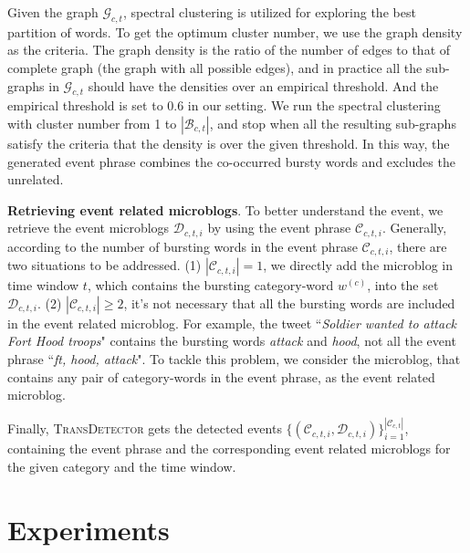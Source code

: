 \documentclass{article}
\begin{document}
Given the graph \(\mathcal{G}_{c,t}\), spectral clustering\cite{von2007tutorial} is utilized for exploring the best partition of words. 
To get the optimum cluster number, we use the graph density as the criteria.
The graph density is the ratio of the number of edges to that of complete graph (the graph with all possible edges), and in practice all the sub-graphs in \(\mathcal{G}_{c,t}\) should have the densities over an empirical threshold. 
And the empirical threshold is set to 0.6 in our setting.
We run the spectral clustering with cluster number from 1 to \(|\mathcal{B}_{c,t}|\), and stop when all the resulting sub-graphs satisfy the criteria that the density is over the given threshold. 
In this way, the generated event phrase combines the co-occurred bursty words and excludes the unrelated. 


\textbf{Retrieving event related microblogs}. 
To better understand the event, we retrieve the event microblogs \(\mathcal{D}_{c,t,i}\) by using the event phrase \(\mathcal{C}_{c,t,i}\).
Generally, according to the number of bursting words in the event phrase \(\mathcal{C}_{c,t,i}\), there are two situations to be addressed. 
(1) \(|\mathcal{C}_{c,t,i}|=1\), we directly add the microblog in time window \(t\), which contains the bursting category-word \(w^{(c)}\), into the set \(\mathcal{D}_{c,t,i}\).
(2) \(|\mathcal{C}_{c,t,i}|\geq 2\), it's not necessary that all the bursting words are included in the event related microblog.
For example, the tweet ``\textit{Soldier wanted to attack Fort Hood troops}" contains the bursting words \textit{attack} and \textit{hood}, not all the event phrase ``\textit{ft, hood, attack}". 
To tackle this problem, we consider the microblog, that contains any pair of category-words in the event phrase, as the event related microblog.

Finally, \textsc{TransDetector} gets the detected events \(\{(\mathcal{C}_{c,t,i},\mathcal{D}_{c,t,i})\}_{i=1}^{|\mathcal{C}_{c,t}|}\), containing the event phrase and the corresponding event related microblogs for the given category and the time window.






\section{Experiments}
\end{document}
